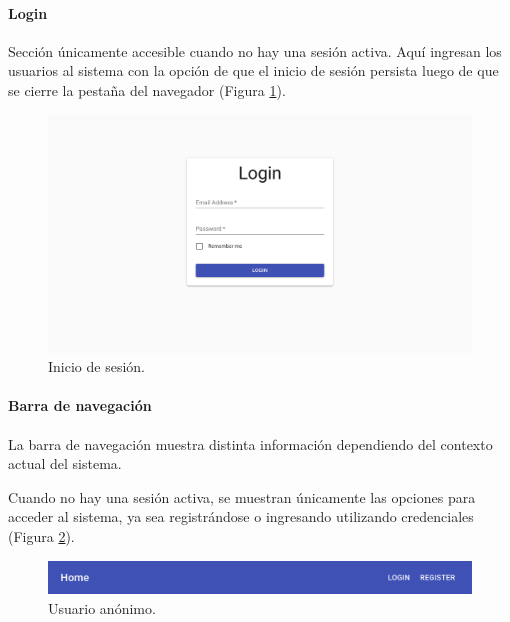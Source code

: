 \documentclass[12pt,a4paper,]{scrartcl}
\let\oldparagraph\paragraph
\renewcommand{\paragraph}[1]{\oldparagraph{#1}\mbox{}}
\begin{document}
\hypertarget{login}{%
\paragraph{Login}\label{login}}

Sección únicamente accesible cuando no hay una sesión activa. Aquí ingresan los usuarios al sistema con la opción de que el inicio de sesión persista luego de que se cierre la pestaña del navegador (Figura \ref{fig:logic-login}).

\begin{figure}[H]

{\centering \includegraphics{assets/logic/login.pdf} 

}

\caption{Inicio de sesión.}\label{fig:logic-login}
\end{figure}

\hypertarget{barra-de-navegaciuxf3n}{%
\paragraph{Barra de navegación}\label{barra-de-navegaciuxf3n}}

La barra de navegación muestra distinta información dependiendo del contexto actual del sistema.

Cuando no hay una sesión activa, se muestran únicamente las opciones para acceder al sistema, ya sea registrándose o ingresando utilizando credenciales (Figura \ref{fig:logic-status-anonymous}).

\begin{figure}[H]

{\centering \includegraphics{assets/logic/status-anonymous.pdf} 

}

\caption{Usuario anónimo.}\label{fig:logic-status-anonymous}
\end{figure}
\end{document}
